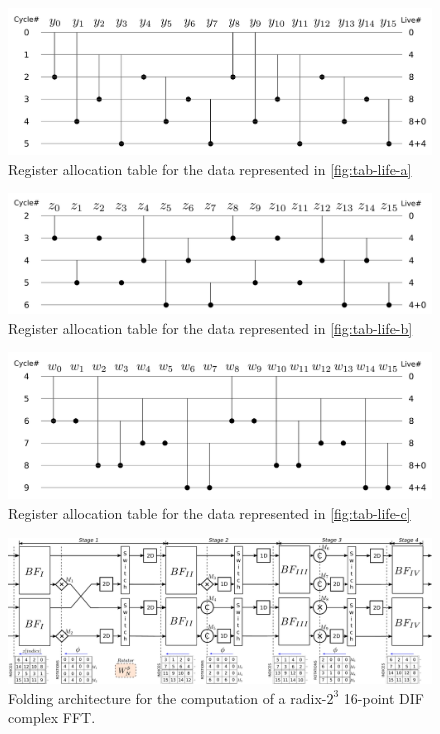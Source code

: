 \documentclass[journal,comsoc]{IEEEtran}
\begin{document}
\begin{figure}[htbp]%
\centering
 \includegraphics[width=1\linewidth]{Diagramas/life_chart_a.png}%
\caption{Register allocation table for the data represented in \ref{fig:tab-life-a}}
\label{fig:tab-aloc-a}
\end{figure}

\begin{figure}[htbp]%
\centering
 \includegraphics[width=1\linewidth]{Diagramas/life_chart_b.png}%
\caption{Register allocation table for the data represented in \ref{fig:tab-life-b}}
\label{fig:tab-aloc-b}
\end{figure}

\begin{figure}[htbp]%
\centering
 \includegraphics[width=1\linewidth]{Diagramas/life_chart_c.png}%
\caption{Register allocation table for the data represented in \ref{fig:tab-life-c}}
\label{fig:tab-aloc-c}
\end{figure}

\begin{figure}[htbp]%
\centering
 \includegraphics[width=0.9\linewidth]{Diagramas/miSeccionFiguras/4Paralelo16pRadix8}%
\caption{Folding architecture for the computation of a radix-$2^3$ 16-point DIF complex FFT.}
\label{fig:circ-folding-16}
\end{figure}
\end{document}
